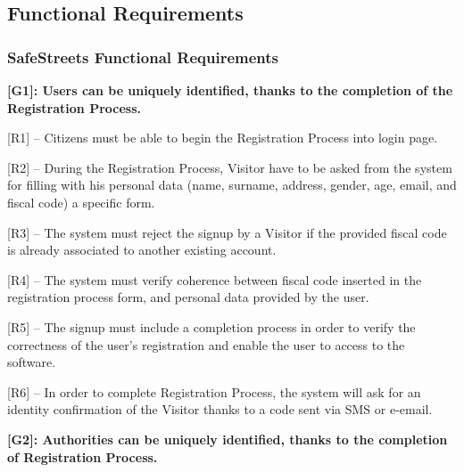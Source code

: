 \documentclass[12pt]{article}
\begin{document}
\newpage

\subsection{Functional Requirements}
\vspace{5mm}

\subsubsection{SafeStreets Functional Requirements}
\vspace{2mm}%
\textbf{[G1]: Users can be uniquely identified, thanks to the completion of the Registration Process.}
\vspace{2mm}
\begin{flushleft}


[R1] -- Citizens must be able to begin the Registration Process into login page.
\vspace{2mm}

[R2] – During the Registration Process, Visitor have to be asked from the system for filling with his personal data (name, surname, address, gender, age, email, and fiscal code) a specific form.
\vspace{2mm}

[R3] – The system must reject the signup by a Visitor if the provided fiscal code is already associated to another existing account.
\vspace{2mm}

[R4] – The system must verify coherence between fiscal code inserted in the registration process form, and personal data provided by the user.
\vspace{2mm}

[R5] – The signup must include a completion process in order to verify the correctness of the user’s registration and enable the user to access to the software.
\vspace{2mm}

[R6] -- In order to complete Registration Process, the system will ask for an identity confirmation of the Visitor thanks to a code sent via SMS or e-email.
\end{flushleft}
\vspace{4mm}
\textbf{[G2]: Authorities can be uniquely identified, thanks to the completion of Registration Process.}
\vspace{2mm}
\end{document}
